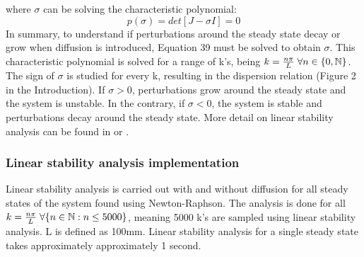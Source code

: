 where $\sigma$ can be solving the characteristic polynomial:
\begin{equation}
    p(\sigma) = det[J-\sigma I] = 0
\end{equation}
In summary, to understand if perturbations around the steady state decay or grow when diffusion is introduced, Equation 39 must be solved to obtain $\sigma$. This characteristic polynomial is solved for a range of k's, being $k=\frac{n\pi}{L} \hspace{0.1cm}\forall n \in \{0, \mathbb{N}\} $. The sign of $\sigma$ is studied for every k, resulting in the dispersion relation (Figure 2 in the Introduction). If $\sigma > 0$, perturbations grow around the steady state and the system is unstable. In the contrary, if  $\sigma < 0$, the system is stable and perturbations decay around the steady state. More detail on linear stability analysis can be found in \cite{J.DMurray2002} or \cite{Glendinning1994}.
\subsubsection{Linear stability analysis implementation}
Linear stability analysis is carried out with and without diffusion for all steady states of the system found using Newton-Raphson. The analysis is done for all $k=\frac{n\pi}{L} \hspace{0.1cm}\forall \{n \in \mathbb{N} : n \leq 5000\} $, meaning 5000 k's are sampled using linear stability analysis. L is defined as 100mm.  Linear stability analysis for a single steady state takes approximately approximately 1 second.

